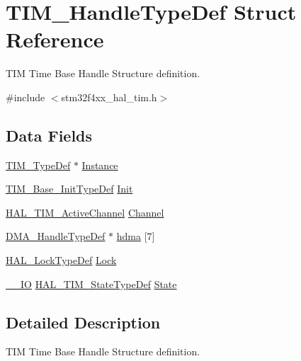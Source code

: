 \hypertarget{struct_t_i_m___handle_type_def}{}\section{T\+I\+M\+\_\+\+Handle\+Type\+Def Struct Reference}
\label{struct_t_i_m___handle_type_def}


T\+IM Time Base Handle Structure definition.  




{\ttfamily \#include $<$stm32f4xx\+\_\+hal\+\_\+tim.\+h$>$}

\subsection*{Data Fields}
\begin{DoxyCompactItemize}
\item 
\hyperlink{struct_t_i_m___type_def}{T\+I\+M\+\_\+\+Type\+Def} $\ast$ \hyperlink{struct_t_i_m___handle_type_def_ad0c5f736a15f6d8d14724854c8133bcc}{Instance}
\item 
\hyperlink{struct_t_i_m___base___init_type_def}{T\+I\+M\+\_\+\+Base\+\_\+\+Init\+Type\+Def} \hyperlink{struct_t_i_m___handle_type_def_a8b2e61c3c4128e62cb7be7d35048152e}{Init}
\item 
\hyperlink{group___t_i_m___exported___types_gaa3fa7bcbb4707f1151ccfc90a8cf9706}{H\+A\+L\+\_\+\+T\+I\+M\+\_\+\+Active\+Channel} \hyperlink{struct_t_i_m___handle_type_def_ae9c5a11c1f5b27c808c0aca453e63870}{Channel}
\item 
\hyperlink{group___d_m_a___exported___types_ga41b754a906b86bce54dc79938970138b}{D\+M\+A\+\_\+\+Handle\+Type\+Def} $\ast$ \hyperlink{struct_t_i_m___handle_type_def_a15338c71de82fa178c685be868e694bd}{hdma} \mbox{[}7\mbox{]}
\item 
\hyperlink{stm32f4xx__hal__def_8h_ab367482e943333a1299294eadaad284b}{H\+A\+L\+\_\+\+Lock\+Type\+Def} \hyperlink{struct_t_i_m___handle_type_def_a2a24b963b57150ed2fb0f051cd87b65a}{Lock}
\item 
\hyperlink{core__sc300_8h_aec43007d9998a0a0e01faede4133d6be}{\+\_\+\+\_\+\+IO} \hyperlink{group___t_i_m___exported___types_gae0994cf5970e56ca4903e9151f40010c}{H\+A\+L\+\_\+\+T\+I\+M\+\_\+\+State\+Type\+Def} \hyperlink{struct_t_i_m___handle_type_def_a6b6eeaf94f2e6e3d0a5bdac44adf21d6}{State}
\end{DoxyCompactItemize}


\subsection{Detailed Description}
T\+IM Time Base Handle Structure definition. 

